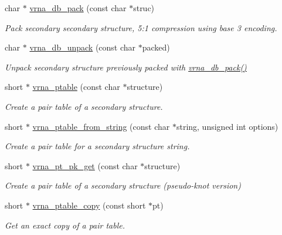 \begin{DoxyCompactItemize}
char $\ast$ \hyperlink{group__struct__utils_ga55c4783060a1464f862f858d5599c9e1}{vrna\+\_\+db\+\_\+pack} (const char $\ast$struc)
\begin{DoxyCompactList}\small\item\em Pack secondary secondary structure, 5\+:1 compression using base 3 encoding. \end{DoxyCompactList}\item 
char $\ast$ \hyperlink{group__struct__utils_ga6490adff857d84ce06e6f379ae3a4512}{vrna\+\_\+db\+\_\+unpack} (const char $\ast$packed)
\begin{DoxyCompactList}\small\item\em Unpack secondary structure previously packed with \hyperlink{group__struct__utils_ga55c4783060a1464f862f858d5599c9e1}{vrna\+\_\+db\+\_\+pack()} \end{DoxyCompactList}\item 
short $\ast$ \hyperlink{group__struct__utils_gae829fb8bb7f694c12a9c0bbc34c77c60}{vrna\+\_\+ptable} (const char $\ast$structure)
\begin{DoxyCompactList}\small\item\em Create a pair table of a secondary structure. \end{DoxyCompactList}\item 
short $\ast$ \hyperlink{group__struct__utils_gac76c9ef3de507748fb0416a59323362b}{vrna\+\_\+ptable\+\_\+from\+\_\+string} (const char $\ast$string, unsigned int options)
\begin{DoxyCompactList}\small\item\em Create a pair table for a secondary structure string. \end{DoxyCompactList}\item 
short $\ast$ \hyperlink{group__struct__utils_gacca520048b24ec5a8978f4dafb4e4bf8}{vrna\+\_\+pt\+\_\+pk\+\_\+get} (const char $\ast$structure)
\begin{DoxyCompactList}\small\item\em Create a pair table of a secondary structure (pseudo-\/knot version) \end{DoxyCompactList}\item 
short $\ast$ \hyperlink{group__struct__utils_ga2daefbbd6d9f8803731651882f54332d}{vrna\+\_\+ptable\+\_\+copy} (const short $\ast$pt)
\begin{DoxyCompactList}\small\item\em Get an exact copy of a pair table. \end{DoxyCompactList}\item 

\end{DoxyCompactItemize}
